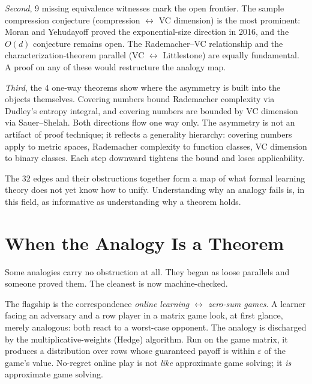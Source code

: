 \emph{Second}, 9 missing equivalence witnesses mark the open frontier.
The sample compression conjecture (compression $\leftrightarrow$ VC
dimension) is the most prominent: Moran and Yehudayoff proved the
exponential-size direction in 2016, and the $O(d)$ conjecture remains open.
The Rademacher--VC relationship and the characterization-theorem parallel
(VC $\leftrightarrow$ Littlestone) are equally fundamental. A proof on any
of these would restructure the analogy map.

\emph{Third}, the 4 one-way theorems show where the asymmetry is built into
the objects themselves. Covering numbers bound Rademacher complexity via
Dudley's entropy integral, and covering numbers are bounded by VC dimension
via Sauer--Shelah. Both directions flow one way only. The asymmetry is not
an artifact of proof technique; it reflects a generality hierarchy: covering
numbers apply to metric spaces, Rademacher complexity to function classes,
VC dimension to binary classes. Each step downward tightens the bound and
loses applicability.

The 32 edges and their obstructions together form a map of what formal
learning theory does not yet know how to unify. Understanding why an analogy
fails is, in this field, as informative as understanding why a theorem
holds.



\section{When the Analogy Is a Theorem}
\label{sec:realized-analogies}

Some analogies carry no obstruction at all. They began as loose parallels
and someone proved them. The cleanest is now machine-checked.

The flagship is the correspondence \emph{online learning
$\leftrightarrow$ zero-sum games}. A learner facing an adversary and a row
player in a matrix game look, at first glance, merely analogous: both react
to a worst-case opponent. The analogy is discharged by the
multiplicative-weights (Hedge) algorithm. Run on the game matrix, it
produces a distribution over rows whose guaranteed payoff is within
$\varepsilon$ of the game's value. No-regret online play is not
\emph{like} approximate game solving; it \emph{is} approximate game solving.

